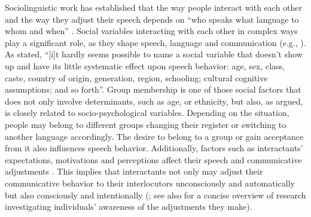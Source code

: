 \documentclass[output=paper,colorlinks,citecolor=brown]{langscibook}
\begin{document}
Sociolinguistic work has established that the way people interact with each other and the way they adjust their speech depends on ``who speaks what language to whom and when'' \citep{fishman1965}. Social variables interacting with each other in complex ways play a significant role, as they shape speech, language and communication (e.g., \citealt{chambers2003,eckert2018,ferguson1959,ferguson1975,fishman1965,goffman1964}). As \citet[133]{goffman1964} stated, ``[i]t hardly seems possible to name a social variable that doesn't show up and have its little systematic effect upon speech behavior: age, sex, class, caste, country of origin, generation, region, schooling; cultural cognitive assumptions;  and so forth''. Group membership is one of those social factors that does not only involve determinants, such as age,  or ethnicity, but also, as \citet[68]{fishman1965} argued, is closely related to socio-psychological variables. Depending on the situation, people may belong to different groups changing their register or switching to another language accordingly. The desire to belong to a group or gain acceptance from it also influences speech behavior. Additionally, factors such as interactants' expectations, motivations and perceptions affect their speech and communicative adjustments \citep{beebe_giles1984,giles_coupland_coupland1991}. This implies that interactants not only may adjust their communicative behavior to their interlocutors unconsciously and automatically but also consciously and intentionally (\citealt{dragojevic_gasiorek_giles2016}; see also \citealt{gasiorek2016b} for a concise overview of research investigating individuals' awareness of the adjustments they make). 
\end{document}
